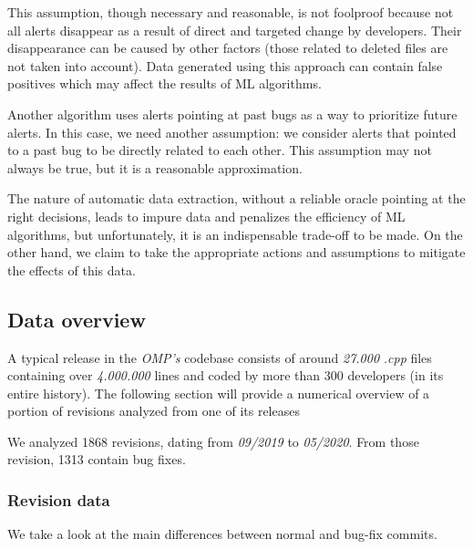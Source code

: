 This assumption, though necessary and reasonable, is not foolproof because not all alerts disappear as a result of direct and targeted change by developers. Their disappearance can be caused by other  factors (those related to deleted files are not taken into account). Data generated using this approach can contain false positives which may affect the results of ML algorithms.

Another algorithm uses alerts pointing at past bugs as a way to prioritize future alerts. In this case, we need another assumption: we consider alerts that pointed to a past bug to be directly related to each other. This assumption may not always be true, but it is a reasonable approximation.

The nature of automatic data extraction, without a reliable oracle pointing at the right decisions, leads to impure data and penalizes the efficiency of ML algorithms, but unfortunately, it is an indispensable trade-off to be made. On the other hand, we claim to take the appropriate actions and assumptions to mitigate the effects of this data.

\subsection{Data overview}
\label{data_collection:overview}

A typical release in the \textit{OMP's} codebase consists of around \textit{27.000} \textit{.cpp} files containing over \textit{4.000.000} lines and coded by more than 300 developers (in its entire history). The following section will provide a numerical overview of a portion of revisions analyzed from one of its releases 

We analyzed 1868 revisions, dating from \textit{09/2019} to \textit{05/2020}. From those revision, 1313 contain bug fixes. 

\subsubsection{Revision data}
We take a look at the main differences between normal and bug-fix commits.


